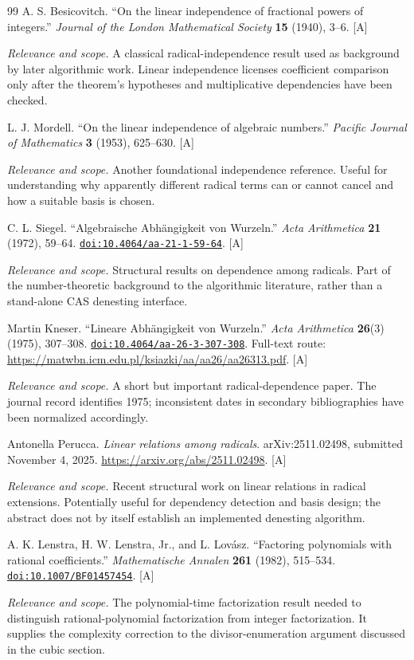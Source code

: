 \documentclass[11pt,letterpaper]{article}
\numberwithin{equation}{section}
\theoremstyle{definition}
\theoremstyle{remark}
\newcommand{\doi}[1]{\href{https://doi.org/#1}{\nolinkurl{doi:#1}}}
\newcommand{\status}[1]{\textsf{\small[#1]}}
\newcommand{\entrynote}[1]{\par\smallskip\noindent\emph{Relevance and scope.} #1}
\begin{document}
\begin{thebibliography}{99}
A. S. Besicovitch. ``On the linear independence of fractional powers of integers.'' \emph{Journal of the London Mathematical Society} \textbf{15} (1940), 3--6. \status{A}
\entrynote{A classical radical-independence result used as background by later algorithmic work. Linear independence licenses coefficient comparison only after the theorem's hypotheses and multiplicative dependencies have been checked.}

L. J. Mordell. ``On the linear independence of algebraic numbers.'' \emph{Pacific Journal of Mathematics} \textbf{3} (1953), 625--630. \status{A}
\entrynote{Another foundational independence reference. Useful for understanding why apparently different radical terms can or cannot cancel and how a suitable basis is chosen.}

C. L. Siegel. ``Algebraische Abh\"angigkeit von Wurzeln.'' \emph{Acta Arithmetica} \textbf{21} (1972), 59--64. \doi{10.4064/aa-21-1-59-64}. \status{A}
\entrynote{Structural results on dependence among radicals. Part of the number-theoretic background to the algorithmic literature, rather than a stand-alone CAS denesting interface.}

Martin Kneser. ``Lineare Abh\"angigkeit von Wurzeln.'' \emph{Acta Arithmetica} \textbf{26}(3) (1975), 307--308. \doi{10.4064/aa-26-3-307-308}. Full-text route: \url{https://matwbn.icm.edu.pl/ksiazki/aa/aa26/aa26313.pdf}. \status{A}
\entrynote{A short but important radical-dependence paper. The journal record identifies 1975; inconsistent dates in secondary bibliographies have been normalized accordingly.}

Antonella Perucca. \emph{Linear relations among radicals}. arXiv:2511.02498, submitted November 4, 2025. \url{https://arxiv.org/abs/2511.02498}. \status{A}
\entrynote{Recent structural work on linear relations in radical extensions. Potentially useful for dependency detection and basis design; the abstract does not by itself establish an implemented denesting algorithm.}

A. K. Lenstra, H. W. Lenstra, Jr., and L. Lov\'asz. ``Factoring polynomials with rational coefficients.'' \emph{Mathematische Annalen} \textbf{261} (1982), 515--534. \doi{10.1007/BF01457454}. \status{A}
\entrynote{The polynomial-time factorization result needed to distinguish rational-polynomial factorization from integer factorization. It supplies the complexity correction to the divisor-enumeration argument discussed in the cubic section.}


\end{thebibliography}
\end{document}
